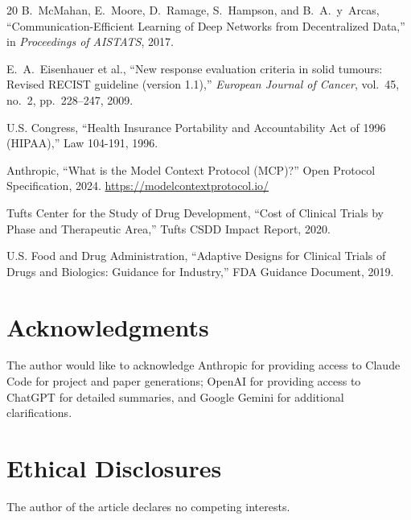 \begin{thebibliography}{20}
B.~McMahan, E.~Moore, D.~Ramage, S.~Hampson, and B.~A.~y~Arcas, ``Communication-Efficient Learning of Deep Networks from Decentralized Data,'' in \textit{Proceedings of AISTATS}, 2017.

E.~A.~Eisenhauer et al., ``New response evaluation criteria in solid tumours: Revised RECIST guideline (version 1.1),'' \textit{European Journal of Cancer}, vol.~45, no.~2, pp.~228--247, 2009.

U.S. Congress, ``Health Insurance Portability and Accountability Act of 1996 (HIPAA),'' Law 104-191, 1996.

Anthropic, ``What is the Model Context Protocol (MCP)?'' Open Protocol Specification, 2024.
\url{https://modelcontextprotocol.io/}

Tufts Center for the Study of Drug Development, ``Cost of Clinical Trials by Phase and Therapeutic Area,'' Tufts CSDD Impact Report, 2020.

U.S. Food and Drug Administration, ``Adaptive Designs for Clinical Trials of Drugs and Biologics: Guidance for Industry,'' FDA Guidance Document, 2019.

\end{thebibliography}

\vspace{-0.15cm}

\section*{Acknowledgments}
\vspace{-0.2cm}
The author would like to acknowledge Anthropic for providing access to Claude Code for project and paper generations; OpenAI for providing access to ChatGPT for detailed summaries, and Google Gemini for additional clarifications.
\vspace{-0.2cm}
\section*{Ethical Disclosures}
\vspace{-0.2cm}
The author of the article declares no competing interests.
\vspace{-0.2cm}
